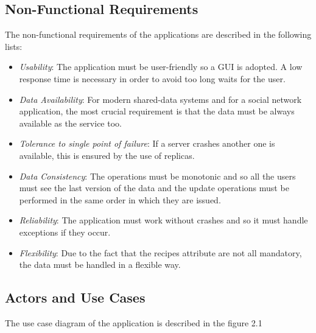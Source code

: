 \documentclass[a4paper]{report}
\begin{document}
\subsection{Non-Functional Requirements}
The non-functional requirements of the applications are described in the following lists:
\begin{itemize}
	\item \emph{Usability}: The application must be user-friendly so a GUI is adopted. A low response time is necessary in order to avoid too long waits for the user.
	\item \emph{Data Availability}: For modern shared-data systems and for a social network application, the most crucial requirement is that the data must be always available as the service too.
	\item \emph{Tolerance to single point of failure}: If a server crashes another one is available, this is ensured by the use of replicas.
	\item \emph{Data Consistency}: The operations must be monotonic and so all the users must see the last version of the data and the update operations must be performed in the same order in which they are issued.

	\item \emph{Reliability}: The application must work without crashes and so it must handle exceptions if they occur.
	
	\item \emph{Flexibility}: Due to the fact that the recipes attribute are not all mandatory, the data must be handled in a flexible way.  
\end{itemize}
\newpage
\subsection{Actors and Use Cases}
The use case diagram of the application is described in the figure 2.1
\end{document}
